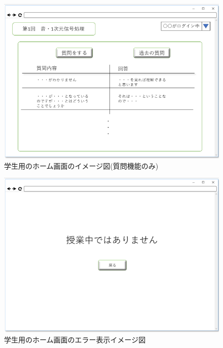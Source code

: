 \begin{figure}[phtbp]
  \begin{center}
    \includegraphics[width=0.8\linewidth,clip]{./img/29.png}
    \caption{学生用のホーム画面のイメージ図(質問機能のみ)}\label{fig:29}
  \end{center}
\end{figure}


\begin{figure}[htbp]
  \begin{center}
    \includegraphics[width=0.5\linewidth,clip]{./img/00.png}
    \caption{学生用のホーム画面のエラー表示イメージ図}\label{fig:00}
  \end{center}
\end{figure}

